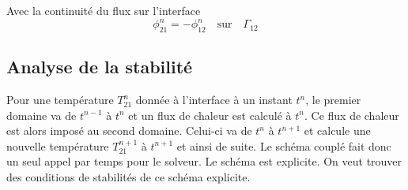 \documentclass[11pt,a4paper]{scrartcl}%
\newcommand{\mtext}[1]{\quad\text{#1}\quad}%
\begin{document}
	Avec la continuité du flux sur l'interface 
	\begin{equation}
	\phi_{21}^n = -\phi_{12}^n \mtext{sur} \Gamma_{12}
	\end{equation}
	
	\subsection{ Analyse de la stabilité}
	Pour une température $T_{21}^n$ donnée à l'interface à un instant $t^n$, le premier domaine va de $t^{n-1}$ à $t^n$ et un flux de chaleur est calculé à $t^n$. Ce flux de chaleur est alors imposé au second domaine. Celui-ci va de $t^n$ à $t^{n+1}$ et calcule une nouvelle température $T_{21}^{n+1}$ à $t^{n+1}$ et ainsi de suite. Le schéma couplé fait donc un seul appel par temps pour le solveur. Le schéma est explicite. On veut trouver des conditions de stabilités de ce schéma explicite. 
\end{document}

